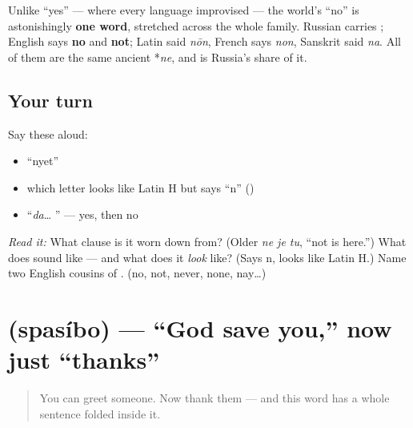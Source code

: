 \begin{cousinweb}
Unlike \textquotedblleft{}yes\textquotedblright{} — where every language improvised — the world's \textquotedblleft{}no\textquotedblright{} is astonishingly \textbf{one word}, stretched across the whole family. Russian \textbf{} carries \emph{}; English says \textbf{no} and \textbf{not}; Latin said \emph{nōn}, French says \emph{non}, Sanskrit said \emph{na}. All of them are the same ancient *\emph{ne}, and \emph{} is Russia's share of it.
\end{cousinweb}

\subsection*{Your turn}
Say these aloud:

\begin{itemize}
\raggedright
  \item \textquotedblleft{}nyet\textquotedblright{}
  \item which letter looks like Latin H but says \textquotedblleft{}n\textquotedblright{} ()
  \item \textquotedblleft{}\emph{da}… \textquotedblright{} — yes, then no
\end{itemize}

\begin{tcolorbox}[breakable,colback=teal!4,colframe=teal!35!black,title={Before you move on}]
\emph{Read it:} \textbf{} What clause is it worn down from? (Older \emph{ne je tu}, \textquotedblleft{}not is here.\textquotedblright{}) What does  sound like — and what does it \emph{look} like? (Says n, looks like Latin H.) Name two English cousins of \emph{}. (no, not, never, none, nay…)
\end{tcolorbox}
\section[\texorpdfstring{\ru{спасибо} (spasíbo)}{спасибо (spasíbo)}]{ (spasíbo) — \textquotedblleft{}God save you,\textquotedblright{} now just \textquotedblleft{}thanks\textquotedblright{}}

\label{lesson:RU-C01-spasibo}



\begin{quote}
You can greet someone. Now thank them — and this word has a whole sentence folded inside it.
\end{quote}

